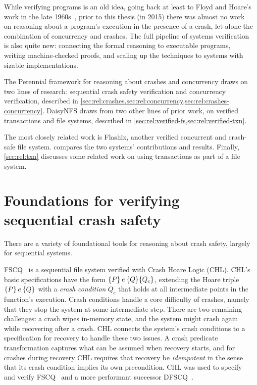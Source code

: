 While verifying programs is an old idea, going back at least to Floyd and
Hoare's work in the late 1960s~\cite{floyd:meanings,hoare:logic}, prior to this
thesis (in 2015) there was almost no work on reasoning about a program's
execution in the presence of a crash, let alone the combination of concurrency
and crashes. The full pipeline of systems verification is also quite new:
connecting the formal reasoning to executable programs, writing machine-checked proofs, and scaling up the techniques to
systems with sizable implementations.

The Perennial framework for reasoning about crashes and concurrency draws on two
lines of research: sequential crash safety verification and concurrency
verification, described in
\cref{sec:rel:crashes,sec:rel:concurrency,sec:rel:crashes-concurrency}. DaisyNFS
draws from two other lines of prior work, on verified transactions and file
systems, described in \cref{sec:rel:verified-fs,sec:rel:verified-txn}.

The most closely related work is Flashix, another verified concurrent and
crash-safe file system.  compares the two systems'
contributions and results. Finally, \cref{sec:rel:txn} discusses some related work
on using transactions as part of a file system.


\section{Foundations for verifying sequential crash safety}
\label{sec:rel:crashes}

There are a variety of foundational tools for reasoning about crash safety,
largely for sequential systems.

FSCQ~\cite{chen:fscq,chen:dfscq,hchen-phd} is a sequential file
system verified with Crash Hoare Logic (CHL). CHL's basic specifications have
the form $\hoareC{P}{e}{Q}{Q_{c}}$, extending the Hoare triple $\hoare{P}{e}{Q}$
with a \emph{crash condition} $Q_{c}$ that holds at all intermediate points in the
function's execution. Crash conditions handle a core difficulty of crashes,
namely that they stop the system at some intermediate step. There are two
remaining challenges: a crash wipes in-memory state, and the system might crash again
while recovering after a crash. CHL connects the system's crash conditions to a
specification for recovery to handle these two issues. A crash predicate
transformation captures what can be assumed when recovery starts, and for
crashes during recovery CHL requires that recovery be \emph{idempotent} in the
sense that its crash condition implies its own precondition. CHL was used to
specify and verify FSCQ~\cite{chen:fscq} and a more performant successor
DFSCQ~\cite{chen:dfscq}.

